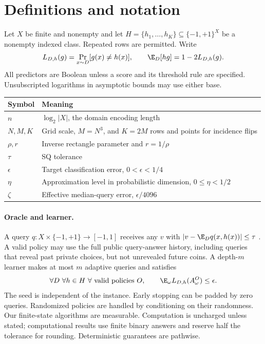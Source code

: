 \section{Definitions and notation}\label{sec:preliminaries}
Let $X$ be finite and nonempty and let $H=\{h_1,\ldots,h_K\}\subseteq\{-1,+1\}^X$ be a nonempty indexed class. Repeated rows are permitted. Write
\[
 L_{D,h}(g)=\Pr_{x\sim D}[g(x)\ne h(x)],\qquad
 \E_D[hg]=1-2L_{D,h}(g).
\]
All predictors are Boolean unless a score and its threshold rule are specified. Unsubscripted logarithms in asymptotic bounds may use either base.

\begin{center}\small
\begin{tabular}{@{}ll@{}}\toprule
Symbol & Meaning\\\midrule
$n$ & $\log_2|X|$, the domain encoding length\\
$N,M,K$ & Grid scale, $M=N^3$, and $K=2M$ rows and points for incidence flips\\
$\rho,r$ & Inverse rectangle parameter and $r=1/\rho$\\
$\tau$ & SQ tolerance\\
$\epsilon$ & Target classification error, $0<\epsilon<1/4$\\
$\eta$ & Approximation level in probabilistic dimension, $0\le\eta<1/2$\\
$\zeta$ & Effective median-query error, $\epsilon/4096$\\\bottomrule
\end{tabular}
\end{center}

\paragraph{Oracle and learner.}
A query $q:X\times\{-1,+1\}\to[-1,1]$ receives any $v$ with $|v-\E_Dq(x,h(x))|\le\tau$ \citep{Kearns98}. A valid policy may use the full public query-answer history, including queries that reveal past private choices, but not unrevealed future coins. A depth-$m$ learner makes at most $m$ adaptive queries and satisfies
\begin{equation}\label{eq:guarantee}
 \forall D\ \forall h\in H\ \forall\text{ valid policies }O,
 \qquad \E_\omega L_{D,h}(A^O_\omega)\le\epsilon.
\end{equation}
The seed is independent of the instance. Early stopping can be padded by zero queries. Randomized policies are handled by conditioning on their randomness. Our finite-state algorithms are measurable. Computation is uncharged unless stated; computational results use finite binary answers and reserve half the tolerance for rounding. Deterministic guarantees are pathwise.

